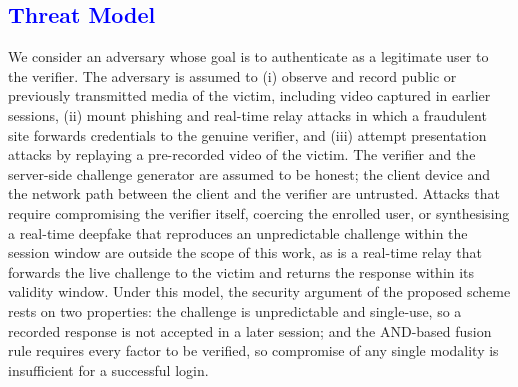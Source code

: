 \documentclass[10pt,journal,compsoc]{IEEEtran}
\begin{document}
{\color{blue}
\subsection{\textcolor{blue}{Threat Model}}
We consider an adversary whose goal is to authenticate as a legitimate user to the verifier. The adversary is assumed to (i) observe and record public or previously transmitted media of the victim, including video captured in earlier sessions, (ii) mount phishing and real-time relay attacks in which a fraudulent site forwards credentials to the genuine verifier, and (iii) attempt presentation attacks by replaying a pre-recorded video of the victim. The verifier and the server-side challenge generator are assumed to be honest; the client device and the network path between the client and the verifier are untrusted. Attacks that require compromising the verifier itself, coercing the enrolled user, or synthesising a real-time deepfake that reproduces an unpredictable challenge within the session window are outside the scope of this work, as is a real-time relay that forwards the live challenge to the victim and returns the response within its validity window. Under this model, the security argument of the proposed scheme rests on two properties: the challenge is unpredictable and single-use, so a recorded response is not accepted in a later session; and the AND-based fusion rule requires every factor to be verified, so compromise of any single modality is insufficient for a successful login.
}
\end{document}
